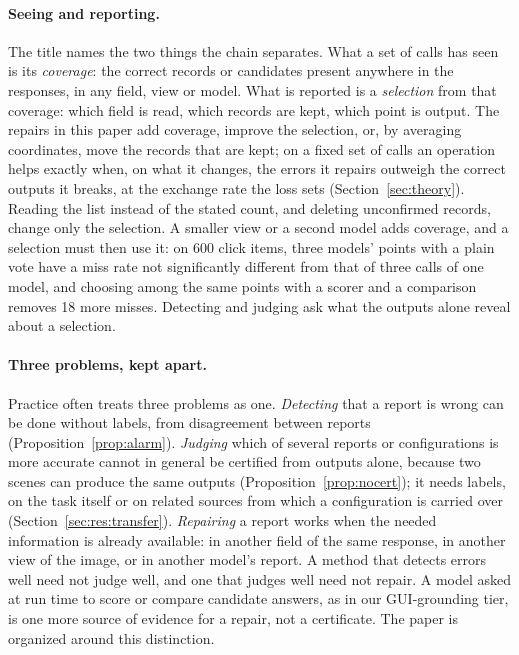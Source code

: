 \paragraph{Seeing and reporting.} The title names the two things the chain separates. What a set of calls has seen is its \emph{coverage}: the correct records or candidates present anywhere in the responses, in any field, view or model. What is reported is a \emph{selection} from that coverage: which field is read, which records are kept, which point is output. The repairs in this paper add coverage, improve the selection, or, by averaging coordinates, move the records that are kept; on a fixed set of calls an operation helps exactly when, on what it changes, the errors it repairs outweigh the correct outputs it breaks, at the exchange rate the loss sets (Section~\ref{sec:theory}). Reading the list instead of the stated count, and deleting unconfirmed records, change only the selection. A smaller view or a second model adds coverage, and a selection must then use it: on 600 click items, three models' points with a plain vote have a miss rate not significantly different from that of three calls of one model, and choosing among the same points with a scorer and a comparison removes 18 more misses. Detecting and judging ask what the outputs alone reveal about a selection.

\paragraph{Three problems, kept apart.} Practice often treats three problems as one. \emph{Detecting} that a report is wrong can be done without labels, from disagreement between reports (Proposition~\ref{prop:alarm}). \emph{Judging} which of several reports or configurations is more accurate cannot in general be certified from outputs alone, because two scenes can produce the same outputs (Proposition~\ref{prop:nocert}); it needs labels, on the task itself or on related sources from which a configuration is carried over (Section~\ref{sec:res:transfer}). \emph{Repairing} a report works when the needed information is already available: in another field of the same response, in another view of the image, or in another model's report. A method that detects errors well need not judge well, and one that judges well need not repair. A model asked at run time to score or compare candidate answers, as in our GUI-grounding tier, is one more source of evidence for a repair, not a certificate. The paper is organized around this distinction.

